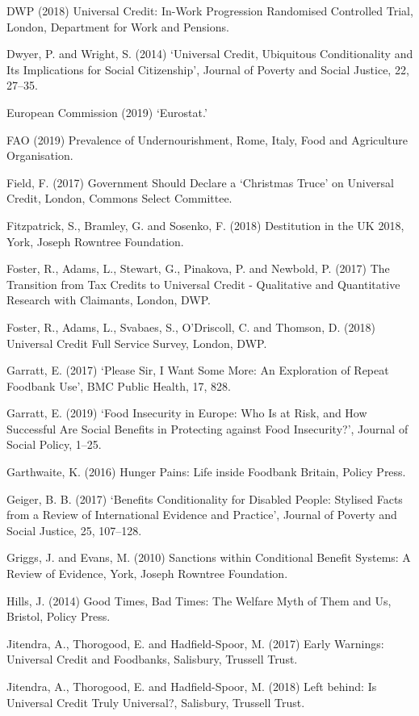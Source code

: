 \documentclass[12pt,article,oneside]{memoir}
\begin{document}
DWP (2018) Universal Credit: In-Work Progression Randomised Controlled Trial, London, Department for Work and Pensions.

Dwyer, P. and Wright, S. (2014) ‘Universal Credit, Ubiquitous Conditionality and Its Implications for Social Citizenship’, Journal of Poverty and Social Justice, 22, 27–35.

European Commission (2019) ‘Eurostat.’

FAO (2019) Prevalence of Undernourishment, Rome, Italy, Food and Agriculture Organisation.

Field, F. (2017) Government Should Declare a ‘Christmas Truce’ on Universal Credit, London, Commons Select Committee.

Fitzpatrick, S., Bramley, G. and Sosenko, F. (2018) Destitution in the UK 2018, York, Joseph Rowntree Foundation.

Foster, R., Adams, L., Stewart, G., Pinakova, P. and Newbold, P. (2017) The Transition from Tax Credits to Universal Credit - Qualitative and Quantitative Research with Claimants, London, DWP.

Foster, R., Adams, L., Svabaes, S., O’Driscoll, C. and Thomson, D. (2018) Universal Credit Full Service Survey, London, DWP.

Garratt, E. (2017) ‘Please Sir, I Want Some More: An Exploration of Repeat Foodbank Use’, BMC Public Health, 17, 828.

Garratt, E. (2019) ‘Food Insecurity in Europe: Who Is at Risk, and How Successful Are Social Benefits in Protecting against Food Insecurity?’, Journal of Social Policy, 1–25.

Garthwaite, K. (2016) Hunger Pains: Life inside Foodbank Britain, Policy Press.

Geiger, B. B. (2017) ‘Benefits Conditionality for Disabled People: Stylised Facts from a Review of International Evidence and Practice’, Journal of Poverty and Social Justice, 25, 107–128.

Griggs, J. and Evans, M. (2010) Sanctions within Conditional Benefit Systems: A Review of Evidence, York, Joseph Rowntree Foundation.

Hills, J. (2014) Good Times, Bad Times: The Welfare Myth of Them and Us, Bristol, Policy Press.

Jitendra, A., Thorogood, E. and Hadfield-Spoor, M. (2017) Early Warnings: Universal Credit and Foodbanks, Salisbury, Trussell Trust.

Jitendra, A., Thorogood, E. and Hadfield-Spoor, M. (2018) Left behind: Is Universal Credit Truly Universal?, Salisbury, Trussell Trust.
\end{document}
